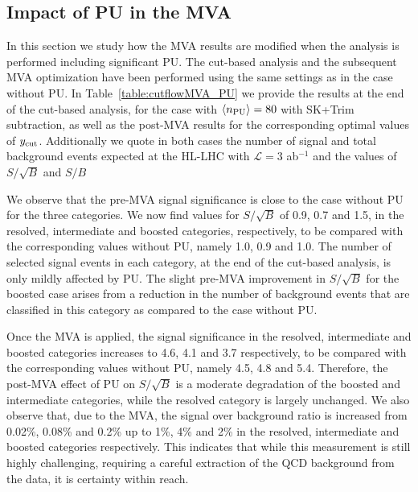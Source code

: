 \subsection{Impact of PU in the MVA}

In this section we study how the MVA results are modified
when the analysis is performed including significant PU.
%
The cut-based analysis and the subsequent
MVA optimization have been performed using the same
settings as in the case without PU.
%
In Table~\ref{table:cutflowMVA_PU} we provide the results
  at the end of the cut-based analysis,
  for the case with $\left\langle n_{\rm PU}\right\rangle=80$ with SK+Trim
  subtraction,
  as well as the post-MVA results for the
  corresponding optimal values of $y_{\rm cut}$.
  Additionally we quote in
  both cases the number of signal and
    total background events expected
    at the HL-LHC with $\mathcal{L}=3$ ab$^{-1}$
    and the values of $S/\sqrt{B}$ and $S/B$

  
We observe that the pre-MVA 
signal significance is close
to the case without PU for the three categories.
%
We now find values for $S/\sqrt{B}$ of 0.9, 0.7 and 1.5, in the resolved,
intermediate and boosted categories, respectively, to be compared
with the corresponding values without PU, namely 1.0, 0.9 and 1.0.
%
The number of selected
signal events in each category, at the
end of the cut-based analysis, is only mildly affected
by PU.
%
The slight pre-MVA improvement in $S/\sqrt{B}$ for the
boosted case arises from a reduction in the number
of background events that are classified in this category
as compared to the case without PU.


Once the MVA is applied, the signal significance in the 
resolved, intermediate and boosted
categories increases to 4.6, 4.1 and 3.7 respectively,
to be compared with the corresponding values
without PU, namely 4.5, 4.8 and 5.4.
%
Therefore, the post-MVA effect of PU on $S/\sqrt{B}$ is
a moderate degradation of the boosted and intermediate categories,
while the resolved category is largely unchanged.
%
We also observe that, due
to the MVA, the
signal over background ratio is increased from 0.02\%, 0.08\% and
0.2\% up to 1\%, 4\% and 2\% in the resolved, intermediate
and boosted categories respectively.
%
This indicates that while this measurement is still highly challenging,
requiring a careful extraction of the QCD
background from the data, it is certainty within reach.

